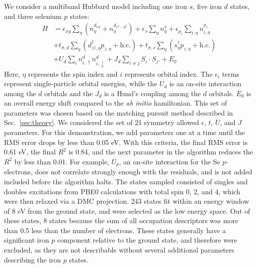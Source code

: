 We consider a multiband Hubbard model including one iron $s$, five iron $d$ states, and three selenium $p$ states:
\begin{align}
  H 
  &=
  \epsilon_{xy} \sum_{\eta} (n^{d_{xy}}_{\eta}  + n^{d_{x^2-y^2}}_{\eta})
  +
  \epsilon_s \sum_{\eta} n^{s}_{\eta} 
  +
  \epsilon_{p_{z}} \sum_{i,\eta} n^{p_{z}}_{i,\eta} 
  \nonumber \\
  &+ 
  t_{\sigma,d} \sum_{\eta} \left( d_{z^2,\eta}^{\dagger} p_{z,\eta} + \text{h.c.} \right)
  +
  t_{\sigma,s} \sum_{\eta} \left(s_{\eta}^{\dagger}  p_{z,\eta} + \text{h.c.} \right)
  \nonumber \\
  &+
  U_d \sum_{i} n^{d}_{i,\uparrow} n^{d}_{i,\downarrow} 
  +
  J_d \sum_{i\ne j} S_i \cdot S_j.
  +
  E_0 \label{eq:fesemodel}
\end{align}
Here, $\eta$ represents the spin index and $i$ represents orbital index.
The $\epsilon_i$ terms represent single-particle orbital energies, while the $U_d$ is an on-site interaction among the $d$ orbitals and the $J_d$ is a Hund's coupling among the $d$ orbitals.
$E_0$ is an overall energy shift compared to the \textit{ab initio} hamiltonian.
This set of parameters was chosen based on the matching pursuit method described in Sec.~\ref{sec:theory}.
We considered the set of 21 symmetry allowed $\epsilon$, $t$, $U$, and $J$ parameters. 
For this demonstration, we add parameters one at a time until the RMS error drops by less than 0.05 eV. 
With this criteria, the final RMS error is 0.61 eV, the final $R^2$ is 0.84, and the next parameter in the algorithm reduces the $R^2$ by less than 0.01.
For example, $U_p$, an on-site interaction for the Se $p$-electrons, does not correlate strongly enough with the residuals, and is not added included before the algorithm halts.
The states sampled consisted of singles and doubles excitations from PBE0 calculations with total spin 0, 2, and 4, which were then relaxed via a DMC projection.
243 states fit within an energy window of 8 eV from the ground state, and were selected as the low energy space.
Out of these states, 8 states because the sum of all occupation descriptors was more than 0.5 less than the number of electrons.
These states generally have a significant iron $p$ component relative to the ground state, and therefore were excluded, as they are not describable without several additional parameters describing the iron $p$ states.

